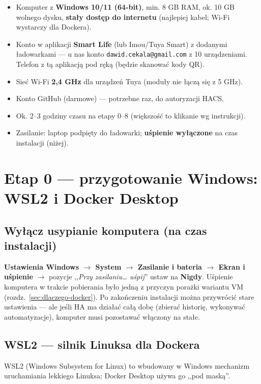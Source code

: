 \documentclass[11pt,a4paper]{article}
\begin{document}
\begin{itemize}
\item Komputer z \textbf{Windows 10/11 (64-bit)}, min. 8 GB RAM, ok. 10 GB wolnego dysku, \textbf{stały dostęp do internetu} (najlepiej kabel; Wi-Fi wystarczy dla Dockera).
\item Konto w aplikacji \textbf{Smart Life} (lub Imou/Tuya Smart) z dodanymi ładowarkami --- u nas konto \texttt{dawid.cekala@gmail.com} z 10 urządzeniami. Telefon z tą aplikacją pod ręką (będzie skanować kody QR).
\item Sieć Wi-Fi \textbf{2,4 GHz} dla urządzeń Tuya (moduły nie łączą się z 5 GHz).
\item Konto GitHub (darmowe) --- potrzebne raz, do autoryzacji HACS.
\item Ok. 2--3 godziny czasu na etapy 0--8 (większość to klikanie wg instrukcji).
\item Zasilanie: laptop podpięty do ładowarki; \textbf{uśpienie wyłączone} na czas instalacji (niżej).
\end{itemize}

\section{Etap 0 --- przygotowanie Windows: WSL2 i Docker Desktop}
\label{sec:etap0}

\subsection{Wyłącz usypianie komputera (na czas instalacji)}

\textbf{Ustawienia Windows $\to$ System $\to$ Zasilanie i bateria $\to$ Ekran i uśpienie} $\to$ pozycje ,,\emph{Przy zasilaniu\ldots{} uśpij}'' ustaw na \textbf{Nigdy}. Uśpienie komputera w trakcie pobierania było jedną z przyczyn porażki wariantu VM (rozdz.~\ref{sec:dlaczego-docker}). Po zakończeniu instalacji można przywrócić stare ustawienia --- ale jeśli HA ma działać całą dobę (zbierać historię, wykonywać automatyzacje), komputer musi pozostawać włączony na stałe.

\subsection{WSL2 --- silnik Linuksa dla Dockera}

WSL2 (Windows Subsystem for Linux) to wbudowany w Windows mechanizm uruchamiania lekkiego Linuksa; Docker Desktop używa go ,,pod maską''.
\end{document}
